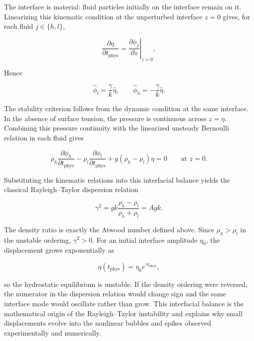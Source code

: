 The interface is material: fluid particles initially on the interface remain on it. Linearizing this kinematic condition at the unperturbed interface $z=0$ gives, for each fluid $j\in\{h,l\}$,

\begin{equation}
\frac{\partial \eta}{\partial t_{\mathrm{phys}}}
=
\left.\frac{\partial \phi_j}{\partial z}\right|_{z=0},
\end{equation}

Hence

\begin{equation}
\hat{\phi}_l=\frac{\gamma}{k}\hat{\eta},
\qquad
\hat{\phi}_h=-\frac{\gamma}{k}\hat{\eta}.
\end{equation}

The stability criterion follows from the dynamic condition at the same interface. In the absence of surface tension, the pressure is continuous across $z=\eta$. Combining this pressure continuity with the linearized unsteady Bernoulli relation in each fluid gives

\begin{equation}
\rho_h\frac{\partial\phi_h}{\partial t_{\mathrm{phys}}}
-
\rho_l\frac{\partial\phi_l}{\partial t_{\mathrm{phys}}}
+
g(\rho_h-\rho_l)\eta
=0
\qquad \text{at } z=0.
\end{equation}

Substituting the kinematic relations into this interfacial balance yields the classical Rayleigh--Taylor dispersion relation

\begin{equation}
\gamma^2
=
gk
\frac{\rho_h-\rho_l}{\rho_h+\rho_l}
=
A g k.
\end{equation}

The density ratio is exactly the Atwood number defined above. Since $\rho_h>\rho_l$ in the unstable ordering, $\gamma^2>0$. For an initial interface amplitude $\eta_0$, the displacement grows exponentially as

\begin{equation}
\eta(t_{\mathrm{phys}})=\eta_0e^{\gamma t_{\mathrm{phys}}},
\end{equation}

so the hydrostatic equilibrium is unstable. If the density ordering were reversed, the numerator in the dispersion relation would change sign and the same interface mode would oscillate rather than grow. This interfacial balance is the mathematical origin of the Rayleigh--Taylor instability and explains why small displacements evolve into the nonlinear bubbles and spikes observed experimentally and numerically.




